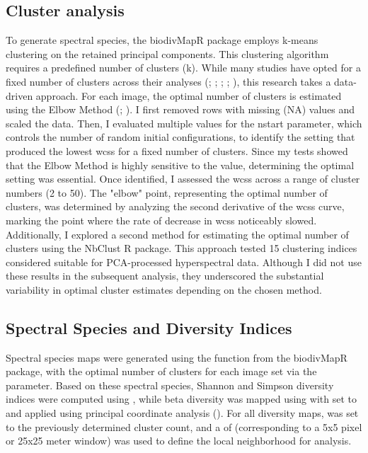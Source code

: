 \subsection{Cluster analysis}
To generate spectral species, the biodivMapR package employs k-means clustering on the retained principal components. This clustering algorithm requires a predefined number of clusters (k). While many studies have opted for a fixed number of clusters across their analyses (\cite{feret_mapping_2014}; \cite{pijnenburg_mapping_2023}; \cite{zhang_assessment_2023}; \cite{robertson_effects_2023}; \cite{liccari_use_2022}), this research takes a data-driven approach. For each image, the optimal number of clusters is estimated using the Elbow Method (\cite{thorndike_who_1953}; \cite{fritz_log-means_2020}). I first removed rows with missing (NA) values and scaled the data. Then, I evaluated multiple values for the nstart parameter, which controls the number of random initial configurations, to identify the setting that produced the lowest \ac{wcss} for a fixed number of clusters. Since my tests showed that the Elbow Method is highly sensitive to the  value, determining the optimal setting was essential. Once identified, I assessed the \ac{wcss} across a range of cluster numbers (2 to 50). The "elbow" point, representing the optimal number of clusters, was determined by analyzing the second derivative of the \ac{wcss} curve, marking the point where the rate of decrease in \ac{wcss} noticeably slowed. Additionally, I explored a second method for estimating the optimal number of clusters using the NbClust R package. This approach tested 15 clustering indices considered suitable for PCA-processed hyperspectral data. Although I did not use these results in the subsequent analysis, they underscored the substantial variability in optimal cluster estimates depending on the chosen method.

\subsection{Spectral Species and Diversity Indices}
Spectral species maps were generated using the  function from the biodivMapR package, with the optimal number of clusters for each image set via the  parameter. Based on these spectral species, Shannon and Simpson diversity indices were computed using , while beta diversity was mapped using  with  set to  and  applied using principal coordinate analysis (). For all diversity maps,  was set to the previously determined cluster count, and a  of  (corresponding to a 5x5 pixel or 25x25 meter window) was used to define the local neighborhood for analysis.

